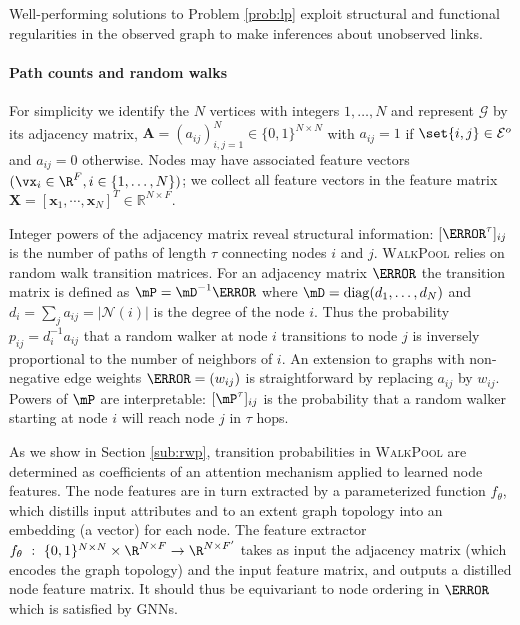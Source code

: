 \documentclass[11pt]{article}
\newcommand{\walkpool}{\textsc{WalkPool}\xspace}
\begin{document}
Well-performing solutions to Problem \ref{prob:lp} exploit structural and functional regularities in the observed graph to make inferences about unobserved links.
\vspace{-1mm}
\paragraph{Path counts and random walks} For simplicity we identify the $N$ vertices with integers $1, \ldots, N$ and represent $\mathcal{G}$ by its adjacency matrix, $\mathbf{A} = (a_{ij})_{i,j=1}^N \in\{0,1\}^{N\times N}$ with $a_{ij} = 1$ if $\set{i, j} \in \mathcal{E}^o$ and $a_{ij} = 0$ otherwise.
Nodes may have associated feature vectors $(\vx_i \in \R^F, i \in \{1, \ldots, N\})$; we collect all feature vectors in the feature matrix $\mathbf{X} = [\mathbf{x}_1,\cdots,\mathbf{x}_N]^T \in \mathbb{R}^{N\times F}$.

Integer powers of the adjacency matrix reveal structural information: $[\mA^{\tau}]_{ij}$ is the number of paths of length $\tau$ connecting nodes $i$ and $j$. 
\walkpool relies on random walk transition matrices. For an adjacency matrix $\mA$ the transition matrix is defined as $\mP = \mD^{-1} \mA$ where $\mD = \mathrm{diag}(d_1, \ldots, d_N)$ and $d_i = \sum_j a_{ij} = | \mathcal{N}(i) |$ is the degree of the node $i$. Thus the probability $p_{ij} = d_i^{-1} a_{ij} $ that a random walker at node $i$ transitions to node $j$ is inversely proportional to the number of neighbors of $i$. An extension to graphs with non-negative edge weights $\mW = (w_{ij})$ is straightforward by replacing $a_{ij}$ by $w_{ij}$. Powers of $\mP$ are interpretable: $[\mP^\tau]_{ij}$ is the probability that a random walker starting at node $i$ will reach node $j$ in $\tau$ hops.

As we show in Section \ref{sub:rwp},  transition probabilities in \walkpool are determined as coefficients of an attention mechanism applied to learned node features. The node features are in turn extracted by a parameterized function $f_\theta$, which distills input attributes and to an extent graph topology into an embedding (a vector) for each node. The feature extractor $f_\theta \ : \ \{ 0, 1\}^{N \times N} \times \R^{N \times F} \to \R^{N \times F'}$ takes as input the adjacency matrix (which encodes the graph topology) and the input feature matrix, and outputs a distilled node feature matrix. It should thus be equivariant to node ordering in $\mA$ which is satisfied by GNNs.

\vspace{-1mm}
\end{document}

